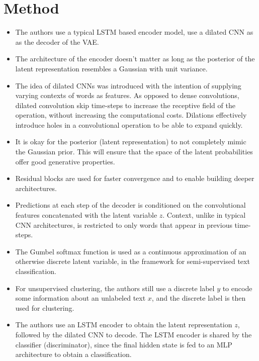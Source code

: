 \documentclass[12pt]{article}
\begin{document}
\section{Method}
  \begin{itemize}
    \item The authors use a typical LSTM based encoder model, use a dilated CNN as as the decoder of the VAE.
    \item The architecture of the encoder doesn't matter as long as the posterior of the latent representation resembles a Gaussian with unit variance.
    \item The idea of dilated CNNs was introduced with the intention of supplying varying contexts of words as features. As opposed to dense convolutions, dilated convolution skip time-steps to increase the receptive field of the operation, without increasing the computational costs. Dilations effectively introduce holes in a convolutional operation to be able to expand quickly.
    \item It is okay for the posterior (latent representation) to not completely mimic the Gaussian prior. This will ensure that the space of the latent probabilities offer good generative properties.
    \item Residual blocks are used for faster convergence and to enable building deeper architectures.
    \item Predictions at each step of the decoder is conditioned on the convolutional features concatenated with the latent variable $z$. Context, unlike in typical CNN architectures, is restricted to only words that appear in previous time-steps.
    \item The Gumbel softmax function is used as a continuous approximation of an otherwise discrete latent variable, in the framework for semi-supervised text classification.
    \item For unsupervised clustering, the authors still use a discrete label $y$ to encode some information about an unlabeled text $x$, and the discrete label is then used for clustering.
    \item The authors use an LSTM encoder to obtain the latent representation $z$, followed by the dilated CNN to decode. The LSTM encoder is shared by the classifier (discriminator), since the final hidden state is fed to an MLP architecture to obtain a classification.
  \end{itemize}
\end{document}
